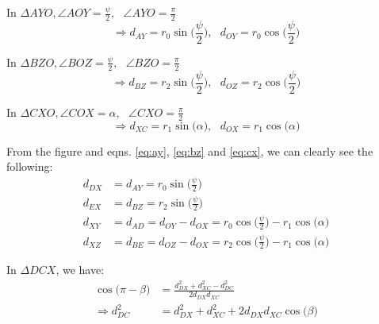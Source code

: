         In $\Delta AYO ,\angle AOY = \displaystyle\frac{\psi}{2}, \: \: \: \angle AYO = \frac{\pi}{2}$
        \begin{equation}
        \label{eq:ay}
            \Rightarrow d_{AY} = r_0  \sin \Big(\displaystyle\frac{\psi}{2}\Big), \: \: \: d_{OY} = r_0  \cos \Big(\displaystyle\frac{\psi}{2}\Big)
        \end{equation}

        In $\Delta BZO ,\angle BOZ = \displaystyle\frac{\psi}{2}, \: \: \: \angle BZO = \frac{\pi}{2}$
        \begin{equation}
        \label{eq:bz}
            \Rightarrow d_{BZ} = r_2  \sin \Big(\displaystyle\frac{\psi}{2}\Big), \: \: \: d_{OZ} = r_2  \cos \Big(\displaystyle\frac{\psi}{2}\Big)
        \end{equation}

        In $\Delta CXO ,\angle COX = \alpha, \: \: \: \angle CXO = \frac{\pi}{2}$
        \begin{equation}
        \label{eq:cx}
            \Rightarrow d_{XC} = r_1  \sin \big(\alpha\big), \: \: \: d_{OX} = r_1  \cos \big(\alpha\big)
        \end{equation}

        From the figure and eqns. \eqref{eq:ay}, \eqref{eq:bz} and \eqref{eq:cx}, we can clearly see the following:
        \begin{equation}
        \label{eq:adbe}
            \begin{aligned}
                d_{DX} &= d_{AY} = r_0  \sin \Big(\displaystyle\frac{\psi}{2}\Big)\\
                d_{EX} &= d_{BZ} = r_2  \sin \Big(\displaystyle\frac{\psi}{2}\Big)\\
                d_{XY} &= d_{AD} = d_{OY} - d_{OX} = r_0  \cos \Big(\displaystyle\frac{\psi}{2}\Big) - r_1  \cos \big(\alpha\big)\\
                d_{XZ} &= d_{BE} = d_{OZ} - d_{OX} = r_2  \cos \Big(\displaystyle\frac{\psi}{2}\Big) - r_1  \cos \big(\alpha\big)
            \end{aligned}
        \end{equation}

        In $\Delta DCX$, we have:
        \begin{equation}
        \label{eq:dc}
            \begin{aligned}
                \cos \big( \pi - \beta \big) &= \frac{d_{DX}^2 + d_{XC}^2 - d_{DC}^2}{2  d_{DX}  d_{XC}}\\
                \Rightarrow d_{DC}^2 &= d_{DX}^2 + d_{XC}^2 + 2  d_{DX}  d_{XC}  \cos \big( \beta \big)
            \end{aligned}
        \end{equation}

